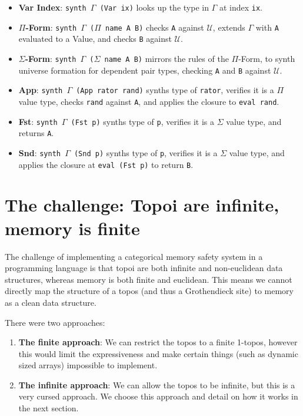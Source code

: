 \documentclass[11pt]{article}
\newcommand{\ctx}{\Gamma}
\begin{document}
\begin{itemize}
    \item \textbf{Var Index}: \texttt{synth $\ctx$ (Var ix)} looks up the type in $\ctx$ at index \texttt{ix}.
    \item \textbf{$\Pi$-Form}: \texttt{synth $\ctx$ ($\Pi$ name A B)} checks \texttt{A} against $\mathcal{U}$,
          extends $\ctx$ with \texttt{A} evaluated to a Value, and checks \texttt{B} against $\mathcal{U}$.
    \item \textbf{$\Sigma$-Form}: \texttt{synth $\ctx$ ($\Sigma$ name A B)} mirrors the rules of the $\Pi$-Form, to synth
          universe formation for dependent pair types, checking \texttt{A} and \texttt{B} against $\mathcal{U}$.
    \item \textbf{App}: \texttt{synth $\ctx$ (App rator rand)} synths type of \texttt{rator}, verifies it is a $\Pi$ value type, checks
          \texttt{rand} against \texttt{A}, and applies the closure to \texttt{eval rand}.
    \item \textbf{Fst}: \texttt{synth $\ctx$ (Fst p)} synths type of \texttt{p}, verifies it is a $\Sigma$ value type, and returns \texttt{A}.
    \item \textbf{Snd}: \texttt{synth $\ctx$ (Snd p)} synths type of \texttt{p}, verifies it is a $\Sigma$ value type, and applies the closure at
          \texttt{eval (Fst p)} to return \texttt{B}.
\end{itemize}

\pagebreak

\section{The challenge: Topoi are infinite, memory is finite}
The challenge of implementing a categorical memory safety system in a programming language is that topoi are both infinite
and non-euclidean data structures, whereas memory is both finite and euclidean. This means we cannot directly map the structure of a topos
(and thus a Grothendieck site) to memory as a clean data structure.

There were two approaches:
\begin{enumerate}
    \item \textbf{The finite approach}: We can restrict the topos to a finite 1-topos, however this would limit the expressiveness and
          make certain things (such as dynamic sized arrays) impossible to implement.
    \item \textbf{The infinite approach}: We can allow the topos to be infinite, but this is a very cursed approach. We choose this approach
          and detail on how it works in the next section.
\end{enumerate}
\end{document}
